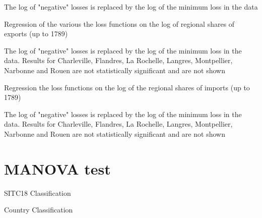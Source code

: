 \documentclass[12pt,a4paper,notitlepage,english]{article}
\begin{document}
\begin{appendix}
\begin{table}[h!]
	
	The log of "negative" losses is replaced by the log of the minimum loss in the data
\end{table}

\begin{landscape}
	\begin{table}[h!]
		\caption{Regression of the various the loss functions on the log of regional shares of exports (up to 1789)}
		\label{Individual_regressions_region_exports}
		\footnotesize
		
		
		The log of "negative" losses is replaced by the log of the minimum loss in the data. Results for Charleville, Flandres, La Rochelle, Langres, Montpellier, Narbonne and Rouen are not statistically significant and are not shown
	\end{table}
	
	\begin{table}[h!]
		\caption{Regression the loss functions on the log of the regional shares of imports (up to 1789)}
		\label{Individual_regressions_region_imports}
		\footnotesize
		
		
		The log of "negative" losses is replaced by the log of the minimum loss in the data. Results for Charleville, Flandres, La Rochelle, Langres, Montpellier, Narbonne and Rouen are not statistically significant and are not shown
	\end{table}
	
\end{landscape}

\begin{landscape}

\end{landscape}
\begin{landscape}

\end{landscape}
\begin{landscape}

\end{landscape}
\begin{landscape}

\end{landscape}
\begin{landscape}

\end{landscape}
\begin{landscape}

\end{landscape}

\section{MANOVA test} 
\begin{table}[h!]
\centering
\caption{SITC18 Classification}
\label{tab:class_sitc18}

\end{table}
\begin{table}[h!]
\centering
\caption{Country Classification}
\label{tab:class_pays7}

\end{table}





\end{appendix}
\end{document}

